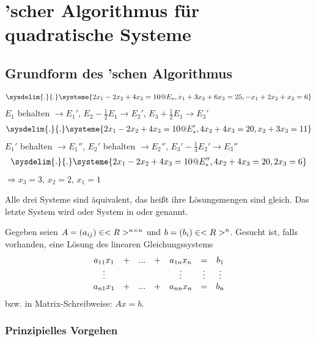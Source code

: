 \section{'scher Algorithmus für quadratische Systeme}

\subsection{Grundform des 'schen Algorithmus}

\begin{example}
	\begin{align}
		\sysdelim{.}{.}\systeme{2x_1-2x_2+4x_3=10@E_{*},x_1+3x_2+6x_3=25,-x_1+2x_2+x_3=6}\notag
	\end{align}
	$E_1$ behalten $\to E_1'$, $E_2-\frac{1}{2}E_1\to E_2'$, $E_3+\frac{1}{2}E_1\to E_3'$
	\begin{align}
		\sysdelim{.}{.}\systeme{2x_1-2x_2+4x_3=10@E'_{*},4x_2+4x_3=20,x_2+3x_3=11}\notag
	\end{align}
	$E_1'$ behalten $\to E_1''$, $E_2'$ behalten $\to E_2''$, $E_3'-\frac{1}{4}E_2'\to E_3''$
	\begin{align}
		\sysdelim{.}{.}\systeme{2x_1-2x_2+4x_3=10@E''_{*},4x_2+4x_3=20,2x_3=6}\notag
	\end{align}
	$\Rightarrow x_3=3$, $x_2=2$, $x_1=1$
\end{example}

Alle drei Systeme sind äquivalent, das heißt ihre Lösungsmengen sind gleich. Das letzte System wird  oder System in  oder  genannt.

Gegeben seien $A=(a_{ij})\in<R>^{n\times n}$ und $b=(b_i)\in<R>^n$. Gesucht ist, falls vorhanden, eine Lösung des linearen Gleichungssystems
\begin{align}
	\begin{array}{ccccccc}
		a_{11}x_1 & + & ... & + & a_{1n}x_n & = & b_1 \\
		\vdots & && & \vdots & \vdots & \vdots \\
		a_{n1}x_1 & + & ... & + & a_{nn}x_n & = & b_n
	\end{array}\notag
\end{align}
bzw. in Matrix-Schreibweise: $Ax=b$.

\subsubsection*{Prinzipielles Vorgehen}

